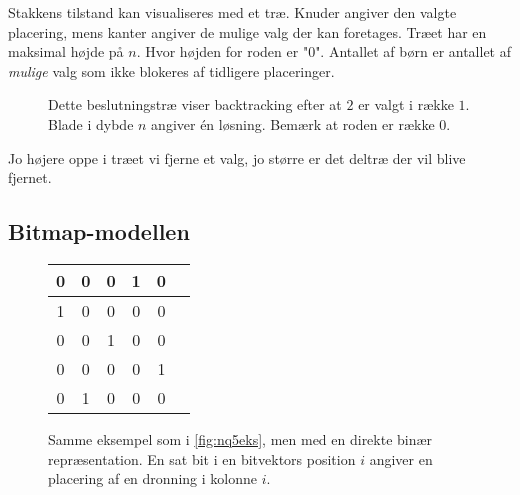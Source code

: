 \documentclass[pdf,draft,a4paper,11pt]{article}
\begin{document}
Stakkens tilstand kan visualiseres med et træ. Knuder angiver den valgte placering, mens kanter angiver de mulige valg der kan foretages.  Træet har en maksimal højde på $n$. Hvor højden for roden er "0". Antallet af børn er antallet af \emph{mulige} valg som ikke blokeres af tidligere placeringer. 

\begin{figure}[!h]
\begin{center}
	

\caption{
Dette beslutningstræ viser backtracking efter at $2$ er valgt i række $1$. Blade i dybde $n$ angiver én løsning. Bemærk at roden er række 0.}
\label{fig:tree}
\end{center}
\end{figure}

Jo højere oppe i træet vi fjerne et valg, jo større er det deltræ der vil blive fjernet.

\subsection{Bitmap-modellen}\label{bitmapmodellen}

\begin{figure}
\begin{center}
\begin{tabular}{|c|c|c|c|c|c}
\hline	0 & 0 & 0 & 1 & 0 \\
\hline	1 & 0 & 0 & 0 & 0 \\
\hline	0 & 0 & 1 & 0 & 0 \\
\hline	0 & 0 & 0 & 0 & 1 \\
\hline	0 & 1 & 0 & 0 & 0 \\
\hline
\end{tabular}
\end{center}
\caption{Samme eksempel som i \ref{fig:nq5eks}, men med en direkte binær repræsentation. En sat bit i en bitvektors position $i$ angiver en placering af en dronning i kolonne $i$.}
\label{fig:nq5eksbitmap}
\end{figure}
\end{document}

